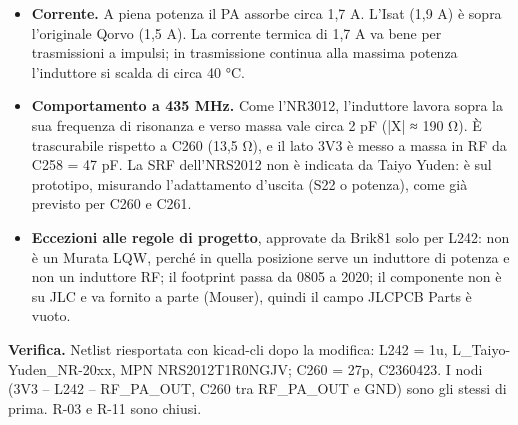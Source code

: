 \begin{itemize}
\item \textbf{Corrente.} A piena potenza il PA assorbe circa 1,7 A. L'Isat (1,9 A) è sopra l'originale Qorvo (1,5 A). La corrente termica di 1,7 A va bene per trasmissioni a impulsi; in trasmissione continua alla massima potenza l'induttore si scalda di circa 40 °C.
\item \textbf{Comportamento a 435 MHz.} Come l'NR3012, l'induttore lavora sopra la sua frequenza di risonanza e verso massa vale circa 2 pF (|X| ≈ 190 Ω). È trascurabile rispetto a C260 (13,5 Ω), e il lato 3V3 è messo a massa in RF da C258 = 47 pF. La SRF dell'NRS2012 non è indicata da Taiyo Yuden: è  sul prototipo, misurando l'adattamento d'uscita (S22 o potenza), come già previsto per C260 e C261.
\item \textbf{Eccezioni alle regole di progetto}, approvate da Brik81 solo per L242: non è un Murata LQW, perché in quella posizione serve un induttore di potenza e non un induttore RF; il footprint passa da 0805 a 2020; il componente non è su JLC e va fornito a parte (Mouser), quindi il campo JLCPCB Parts è vuoto.
\end{itemize}

\textbf{Verifica.} Netlist riesportata con kicad-cli dopo la modifica: L242 = 1u, L\_\allowbreak{}Taiyo-Yuden\_\allowbreak{}NR-20xx, MPN NRS2012T1R0NGJV; C260 = 27p, C2360423. I nodi (3V3 – L242 – RF\_\allowbreak{}PA\_\allowbreak{}OUT, C260 tra RF\_\allowbreak{}PA\_\allowbreak{}OUT e GND) sono gli stessi di prima. R-03 e R-11 sono chiusi.
